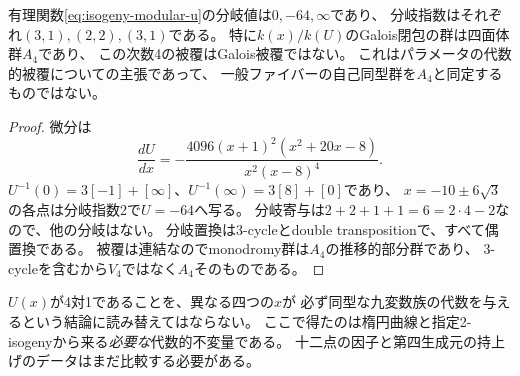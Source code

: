 \begin{corollary}[四対一被覆の分岐と四面体群]\label{cor:isogeny-a4}
有理関数\eqref{eq:isogeny-modular-u}の分岐値は$0,-64,\infty$であり、
分岐指数はそれぞれ$(3,1),(2,2),(3,1)$である。
特に$k(x)/k(U)$のGalois閉包の群は四面体群$A_4$であり、
この次数4の被覆はGalois被覆ではない。
これはパラメータの代数的被覆についての主張であって、
一般ファイバーの自己同型群を$A_4$と同定するものではない。
\end{corollary}
\begin{proof}
微分は
\[
 \frac{dU}{dx}=-\frac{4096(x+1)^2(x^2+20x-8)}{x^2(x-8)^4}.
\]
$U^{-1}(0)=3[-1]+[\infty]$、$U^{-1}(\infty)=3[8]+[0]$であり、
$x=-10\pm6\sqrt3$の各点は分岐指数2で$U=-64$へ写る。
分岐寄与は$2+2+1+1=6=2\cdot4-2$なので、他の分岐はない。
分岐置換は3-cycleとdouble transpositionで、すべて偶置換である。
被覆は連結なのでmonodromy群は$A_4$の推移的部分群であり、
3-cycleを含むから$V_4$ではなく$A_4$そのものである。
\end{proof}

\begin{remark}
$U(x)$が4対1であることを、異なる四つの$x$が
必ず同型な九変数族の代数を与えるという結論に読み替えてはならない。
ここで得たのは楕円曲線と指定2-isogenyから来る\emph{必要な}代数的不変量である。
十二点の因子と第四生成元の持上げのデータはまだ比較する必要がある。
\end{remark}
